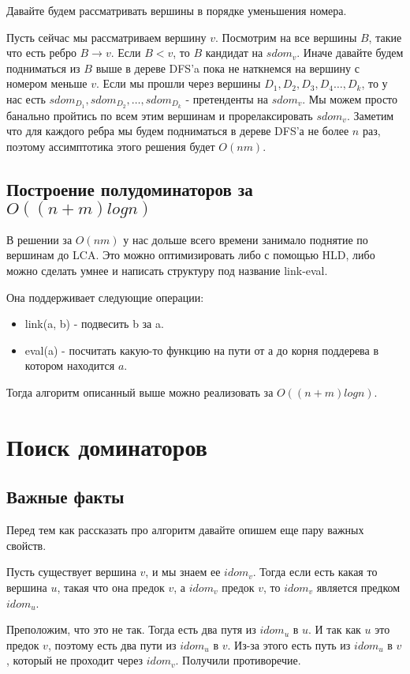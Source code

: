 \documentclass[a4paper, fontsize=12pt]{article}
\begin{document}
Давайте будем рассматривать вершины в порядке уменьшения номера.

Пусть сейчас мы рассматриваем вершину $v$. Посмотрим на все вершины $B$, такие что есть ребро $B \rightarrow v$. Если $B < v$, то $B$ кандидат на $sdom_v$. Иначе давайте будем подниматься из $B$ выше в дереве DFS'a пока не наткнемся на вершину с номером меньше $v$. Если мы прошли через вершины $D_1, D_2, D_3, D_4 \ldots, D_k$, то у нас есть $sdom_{D_1}, sdom_{D_2}, \ldots, sdom_{D_k}$ - претенденты на $sdom_v$. Мы можем просто банально пройтись по всем этим вершинам и прорелаксировать $sdom_v$. Заметим что для каждого ребра мы будем подниматься в дереве DFS'а не более $n$ раз, поэтому ассимптотика этого решения будет $O(nm)$.

\subsection{Построение полудоминаторов за $O((n + m) log n)$}

В решении за $O(nm)$ у нас дольше всего времени занимало поднятие по вершинам до LCA. Это можно оптимизировать либо с помощью HLD, либо можно сделать умнее и написать структуру под название link-eval. 

Она поддерживает следующие операции:

\begin{itemize}
    \item link(a, b) - подвесить b за a. 
    \item eval(a) - посчитать какую-то функцию на пути от $а$ до корня поддерева в котором находится $a$.
\end{itemize}

Тогда алгоритм описанный выше можно реализовать за $O((n + m) log n)$.

\newpage

\section{Поиск доминаторов}

\subsection{Важные факты}

Перед тем как рассказать про алгоритм давайте опишем еще пару важных свойств. 

\begin{theorem} \label{t5}
Пусть существует вершина $v$, и мы знаем ее $idom_v$. Тогда если есть какая то вершина $u$, такая что она предок $v$, а $idom_v$ предок $v$, то $idom_v$ является предком $idom_u$. 

Преположим, что это не так. Тогда есть два путя из $idom_u$ в $u$. И так как $u$ это предок $v$, поэтому есть два пути из $idom_u$ в $v$. Из-за этого есть путь из $idom_u$ в $v$, который не проходит через $idom_v$. Получили противоречие.
\end{theorem}
\end{document}
